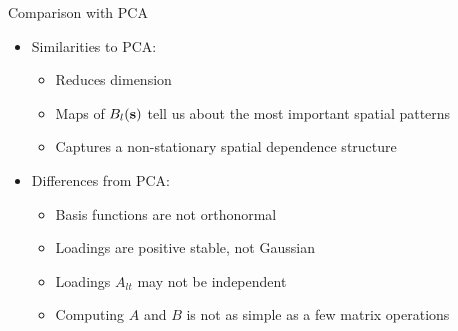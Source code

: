 \documentclass{beamer}
\begin{document}
\begin{frame}{Comparison with PCA}
	\begin{itemize} \setlength{\itemsep}{1em}
		\item Similarities to PCA: \vspace{0.5em}
		\begin{itemize} \setlength{\itemsep}{0.5em}
			\item Reduces dimension
			\item Maps of $B_l(\mathbf{s})$ tell us about the most important spatial patterns
			\item Captures a non-stationary spatial dependence structure
		\end{itemize}
		\item Differences from PCA: \vspace{0.5em}
		\begin{itemize} \setlength{\itemsep}{0.5em}
			\item Basis functions are not orthonormal
			\item Loadings are positive stable, not Gaussian
			\item Loadings $A_{lt}$ may not be independent
			\item Computing $A$ and $B$ is not as simple as a few matrix operations
		\end{itemize}
	\end{itemize}
\end{frame}

%
\end{document}

